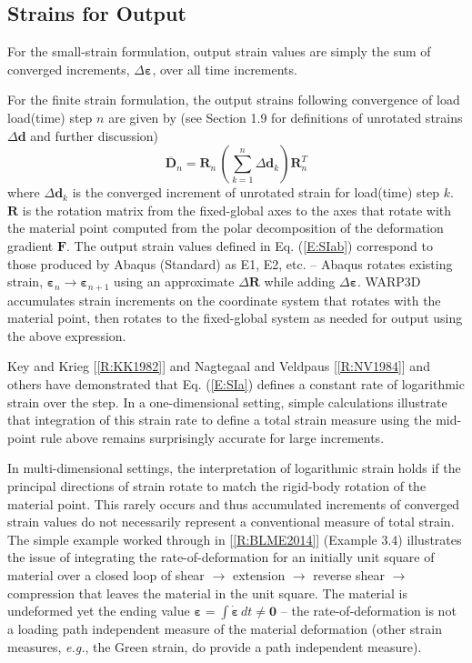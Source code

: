 \documentclass[11pt]{report}
\numberwithin{equation}{section}
\newcommand{\bmf } {\boldsymbol }  %
\newcommand{\eg}{\emph{e.g.},\xspace}
\newcommand{\nid}{\noindent}
\newcommand{\vareps}{\varepsilon}
\begin{document}
\subsection{Strains for Output}

For the small-strain formulation, output strain values are simply  the 
sum of converged increments, $\Delta \bmf{\vareps}$,
over all time increments. 

For the finite strain formulation, the output strains following convergence of load load(time)
step $n$  are given by (see Section 1.9 for definitions of unrotated strains $\Delta \mathbf{d}$
and further discussion)
%
\begin{equation}\label{E:SIab}
\overline{\mathbf{D}}_n= \mathbf {R}_n\, \left  ( \sum_{k=1}^n \Delta \mathbf{d}_k \right ) \mathbf {R}_n^T
\end{equation}
%
\nid 
where $\Delta \mathbf{d}_k$ is the converged increment of unrotated strain for load(time) step $k$.
$\mathbf{R}$ is the rotation matrix from the fixed-global axes to the axes that rotate with the
material point computed from the polar
decomposition of the deformation gradient $\mathbf{F}$.
The output strain values defined in Eq. (\ref{E:SIab}) correspond to those produced by Abaqus (Standard)
as E1, E2, etc. -- Abaqus rotates existing strain, $\bmf{\vareps}_n\rightarrow\bmf{\vareps}_{n+1}$
using an approximate $\Delta \mathbf {R}$ while adding $\Delta \bmf{\vareps}$. 
WARP3D accumulates strain increments on the coordinate
system that rotates with the material point, then rotates to the fixed-global system 
as needed for output using the above expression.

Key and Krieg [\ref{R:KK1982}] and Nagtegaal and Veldpaus [\ref{R:NV1984}] and others have demonstrated
that Eq. (\ref{E:SIa}) defines a constant rate of logarithmic strain over the step. 
In a one-dimensional 
setting, simple calculations illustrate that
integration of this strain rate to define a total strain measure using the 
mid-point rule above remains surprisingly accurate for 
large increments. 

In multi-dimensional settings, the interpretation of 
logarithmic strain holds if the principal directions of 
strain rotate to match the rigid-body rotation of the material point. This rarely 
occurs and thus accumulated increments of converged  strain values 
do not necessarily represent a conventional measure of total strain. The simple example
worked through in [\ref{R:BLME2014}] (Example 3.4)  illustrates the issue of integrating 
the rate-of-deformation for an initially unit square of material over a closed loop of shear $\rightarrow$ 
extension $\rightarrow$ reverse shear $\rightarrow$ compression that
leaves the material in the unit square. The material is undeformed 
yet  the ending value $\bmf{\vareps} = \int \dot {\bmf{\vareps}}\,dt \ne \bmf{0}$ -- the rate-of-deformation 
is not a loading path independent
measure of the material deformation (other strain measures, \eg the Green strain, do 
provide a path independent
measure).
\end{document}
